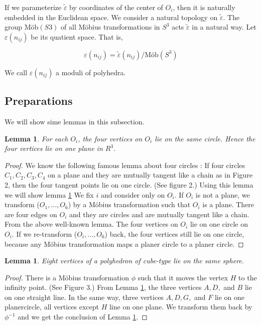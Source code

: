 \documentclass[dvipdfmx]{interact}
\theoremstyle{plain}%
\newtheorem{lemma}[theorem]{Lemma}
\theoremstyle{definition}
\theoremstyle{remark}
\theoremstyle{problemstyle}
\begin{document}
If we parameterize $\tilde\varepsilon$ by coordinates of the center of
$O_i$, then it is naturally embedded in the Euclidean space. We consider
a natural topology on $\tilde\varepsilon$. The group M\"ob$(S3)$ of all
M\"obius transformations in $S^3$ acts $\tilde\varepsilon$ in a natural way.
Let $\varepsilon(n_{ij})$ be its quatient space. That is,

$$
\varepsilon (n_{ij}) = \tilde\varepsilon(n_{ij}) / \text{M\"ob}(S^3)
$$

We call $\varepsilon(n_{ij})$ a moduli of polyhedra.

\subsection{Preparations}

We will show sime lemmas in this subsection.

\begin{lemma}\label{sameCircle}
For each $O_i$, the four vertices on $O_i$ lie on the same circle.
Hence the four vertices lie on one plane in $R^3$.
\end{lemma}

\begin{proof}
 We know the following famous lemma about four circles : If four circles 
 $C_1, C_2, C_3, C_4$ on a plane and they are mutually tangent like a
 chain as in Figure 2, then the four tangent points lie on one circle.
 (See figure 2.) Using this lemma we will show lemma \ref{sameCircle} We fix $i$ and
 consider only on $O_i$. If $O_i$ is not a plane, we transform 
 ($O_1, ..., O_6$) by a M\"obius transformation such that $O_i$ is a
 plane. There are four edges on $O_i$ and they are circles and are
 mutually tangent like a chain. From the above well-known lemma. The
 four vertices on $O_i$ lie on one circle on $O_i$. If we re-transform
 ($O_i, ..., O_6$) back, the four vertices still lie on one circle,
 because any M\"obius transformation maps a planer circle to a planer circle.
\end{proof}

\begin{lemma}\label{eightVertices}
 Eight vertices of a polyhedron of cube-type lie on the same sphere.
\end{lemma}

\begin{proof}
 There is a M\"obius transformation $\phi$ such that it moves the vertex
 $H$ to the infinity point. (See Figure 3.) From Lemma \ref{sameCircle}, the three
 vertices $A, D,$ and $B$ lie on one straight line. In the same way,
 three vertices $A, D, G,$ and $F$ lie on one planercircle, all vertices
 except $H$ line on one plane. We transform them back by $\phi^{-1}$ and
 we get the conclusion of Lemma \ref{eightVertices}.
\end{proof}
\end{document}
